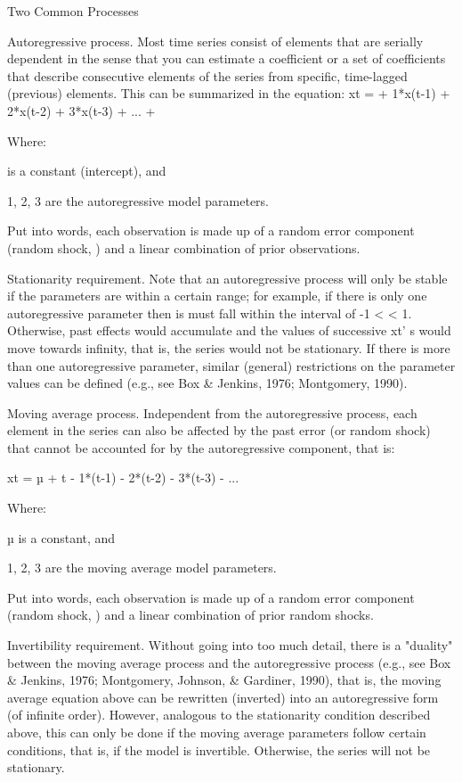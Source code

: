 Two Common Processes

Autoregressive process. Most time series consist of elements that are serially dependent in the sense that you can estimate a coefficient or a set of coefficients that describe consecutive elements of the series from specific, time-lagged (previous) elements. This can be summarized in the equation: xt = + 1*x(t-1) + 2*x(t-2) + 3*x(t-3) + ... + 

Where:

                 is a constant (intercept), and

 1, 2, 3   are the autoregressive model parameters.

Put into words, each observation is made up of a random error component (random shock, ) and a linear combination of prior observations.

Stationarity requirement. Note that an autoregressive process will only be stable if the parameters are within a certain range; for example, if there is only one autoregressive parameter then is must fall within the interval of -1 <  < 1. Otherwise, past effects would accumulate and the values of successive xt' s would move towards infinity, that is, the series would not be stationary. If there is more than one autoregressive parameter, similar (general) restrictions on the parameter values can be defined (e.g., see Box & Jenkins, 1976; Montgomery, 1990).

Moving average process. Independent from the autoregressive process, each element in the series can also be affected by the past error (or random shock) that cannot be accounted for by the autoregressive component, that is:

xt = µ + t - 1*(t-1) - 2*(t-2) - 3*(t-3) - ...

Where:

 µ                is a constant, and

 1, 2, 3  are the moving average model parameters.

Put into words, each observation is made up of a random error component (random shock, ) and a linear combination of prior random shocks.

Invertibility requirement. Without going into too much detail, there is a "duality" between the moving average process and the autoregressive process (e.g., see Box & Jenkins, 1976; Montgomery, Johnson, & Gardiner, 1990), that is, the moving average equation above can be rewritten (inverted) into an autoregressive form (of infinite order). However, analogous to the stationarity condition described above, this can only be done if the moving average parameters follow certain conditions, that is, if the model is invertible. Otherwise, the series will not be stationary.

